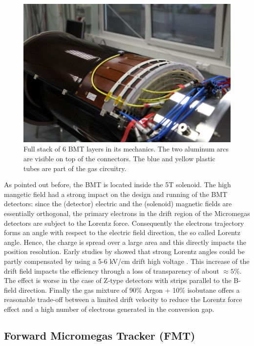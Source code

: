 \begin{figure}[htb]
 \includegraphics[width=1.0\columnwidth,keepaspectratio]{images/fig5}
 \caption{Full stack of 6 BMT layers in its mechanics. The two aluminum arcs are visible on top of the connectors. The blue and yellow plastic tubes are part of the gas circuitry.}
 \label{fig:mm-fig4}
\end{figure}

As pointed out before, the BMT is located inside the 5T solenoid. The high mangetic field had a strong impact on the design and running of the BMT detectors: since the (detector) electric and the (solenoid) magnetic fields are  essentially orthogonal, the primary electrons in the drift region of the Micromegas detectors are subject to the Lorentz force. Consequently the electrons trajectory forms an angle with respect to the electric field direction, the so called Lorentz angle. Hence, the charge is spread over a large area and this directly impacts the position resolution. Early studies by showed that strong Lorentz angles could be partly compensated by using a 5-6 kV/cm drift high voltage \cite{KONCZYKOWSKI2010274}. This increase of the drift field impacts the efficiency through a loss of transparency of about \(\approx5\%\). The effect is worse in the case of Z-type detectors with strips parallel to the B-field direction. Finally the gas mixture of 90\% Argon + 10\% isobutane offers a reasonable trade-off between a limited drift velocity to reduce the Lorentz force effect and a high number of electrons generated in the conversion gap. 

\subsection{Forward Micromegas Tracker (FMT)}

